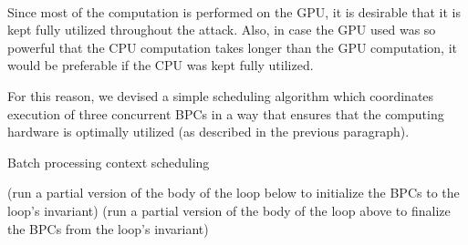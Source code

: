 \documentclass[12pt,oneside]{fithesis2}
\begin{document}
      
      \paragraph*{}
      Since most of the computation is performed on the GPU, it is desirable that it is kept fully utilized throughout the attack. Also, in case the GPU used was so powerful that the CPU computation takes longer than the GPU computation, it would be preferable if the CPU was kept fully utilized.
      
      For this reason, we devised a simple scheduling algorithm which coordinates execution of three concurrent BPCs in a way that ensures that the computing hardware is optimally utilized (as described in the previous paragraph).
      
      \begin{algorithm}
        \caption{Batch processing context scheduling}
        \label{alg:bpcSched}
        \begin{algorithmic}[1]
            \State {}
            \State {}
            \State {}
            \State {}
          \EndProcedure
          \State
            \State {}
            \State {}
            \State {}
          \EndProcedure
          \State
            \State (run a partial version of the body of the loop below to initialize the BPCs to the loop's invariant)
              \State {}
              \State {}
              \State {}
              \State {}
              \State {}
              \State {}
            \EndWhile
            \State (run a partial version of the body of the loop above to finalize the BPCs from the loop's invariant)
          \EndProcedure
        \end{algorithmic}
      \end{algorithm}
      
\end{document}
